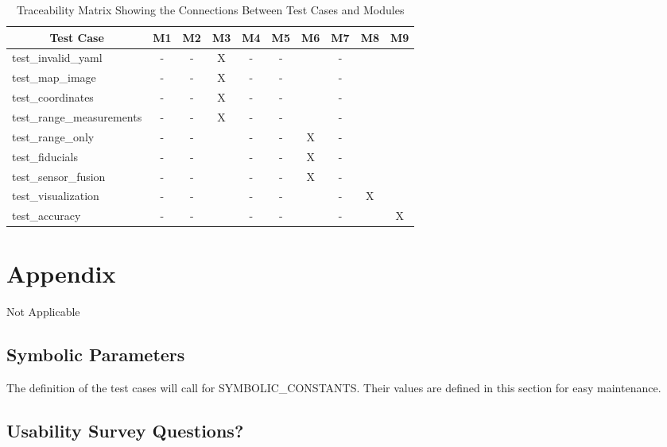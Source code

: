 \documentclass[12pt, titlepage]{article}
\begin{document}
\begin{table}[h!]
  \centering
  \begin{tabular}{|l|c|c|c|c|c|c|c|c|c|}
  \hline
  \multicolumn{1}{|c|}{\textbf{Test Case}} & \textbf{M1} & \textbf{M2} & \textbf{M3} & \textbf{M4} & \textbf{M5} & \textbf{M6} & \textbf{M7} & \textbf{M8} & \textbf{M9} \\ \hline
  test\_invalid\_yaml       & - & - & X & - & - &   & - &   &   \\
  test\_map\_image          & - & - & X & - & - &   & - &   &   \\
  test\_coordinates         & - & - & X & - & - &   & - &   &   \\
  test\_range\_measurements & - & - & X & - & - &   & - &   &   \\ \hline
  test\_range\_only         & - & - &   & - & - & X & - &   &   \\
  test\_fiducials           & - & - &   & - & - & X & - &   &   \\
  test\_sensor\_fusion      & - & - &   & - & - & X & - &   &   \\ \hline
  test\_visualization       & - & - &   & - & - &   & - & X &   \\ \hline
  test\_accuracy            & - & - &   & - & - &  & - &   & X \\ \hline
  \end{tabular}
  \caption{Traceability Matrix Showing the Connections Between Test Cases and Modules}
  \end{table}

				




\newpage

\section{Appendix}\label{sec_appendix}
 Not Applicable

\subsection{Symbolic Parameters}

The definition of the test cases will call for SYMBOLIC\_CONSTANTS.
Their values are defined in this section for easy maintenance.

\subsection{Usability Survey Questions?}


\newpage{}
\end{document}
